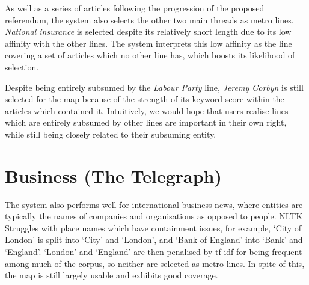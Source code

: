 As well as a series of articles following the progression of the proposed referendum, the system also selects the other two main threads as metro lines. \textit{National insurance} is selected despite its relatively short length due to its low affinity with the other lines. The system interprets this low affinity as the line covering a set of articles which no other line has, which boosts its likelihood of selection.

Despite being entirely subsumed by the \textit{Labour Party} line, \textit{Jeremy Corbyn} is still selected for the map because of the strength of its keyword score within the articles which contained it. Intuitively, we would hope that users realise lines which are entirely subsumed by other lines are important in their own right, while still being closely related to their subsuming entity.

\section{Business (The Telegraph) \label{sec:business}}

The system also performs well for international business news, where entities are typically the names of companies and organisations as opposed to people. NLTK Struggles with place names which have containment issues, for example, `City of London' is split into `City' and `London', and `Bank of England' into `Bank' and `England'. `London' and `England' are then penalised by tf-idf for being frequent among much of the corpus, so neither are selected as metro lines. In spite of this, the map is still largely usable and exhibits good coverage.

